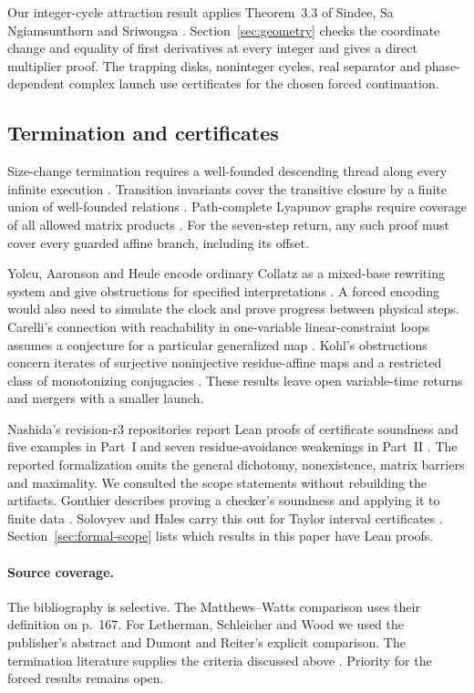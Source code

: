 Our integer-cycle attraction result applies Theorem~3.3 of Sindee, Sa
Ngiamsunthorn and Sriwongsa \cite{sindee-2024}. Section~\ref{sec:geometry}
checks the coordinate change and equality of first derivatives at every
integer and gives a direct multiplier proof. The trapping disks,
noninteger cycles, real separator and phase-dependent complex launch
use certificates for the chosen forced continuation.

\subsection{Termination and certificates}

Size-change termination requires a well-founded descending thread along
every infinite execution \cite{lee-jones-benamram-2001,benamram-2010-monotonicity}.
Transition invariants cover the transitive closure by a finite union of
well-founded relations \cite{podelski-rybalchenko-2004}. Path-complete
Lyapunov graphs require coverage of all allowed matrix products
\cite{ahmadi-et-al-2014}. For the seven-step return, any such proof must
cover every guarded affine branch, including its offset.

Yolcu, Aaronson and Heule encode ordinary Collatz as a mixed-base
rewriting system and give obstructions for specified interpretations
\cite[Section~3.2]{yolcu-aaronson-heule-2023}. A forced encoding would
also need to simulate the clock and prove progress between physical
steps. Carelli's connection with reachability in one-variable
linear-constraint loops assumes a conjecture for a particular
generalized map \cite{carelli-2026}. Kohl's obstructions concern iterates
of surjective noninjective residue-affine maps and a restricted class
of monotonizing conjugacies
\cite{kohl-2007,kohl-2008-conjugates}. These results leave open
variable-time returns and mergers with a smaller launch.

Nashida's revision-r3 repositories report Lean proofs of certificate
soundness and five examples in Part~I and seven residue-avoidance
weakenings in Part~II \cite{nashida-2026,nashida-2026-part-ii}.
The reported formalization omits the general dichotomy, nonexistence,
matrix barriers and maximality. We consulted the scope statements
without rebuilding the artifacts. Gonthier describes proving a checker's
soundness and applying it to finite data \cite{gonthier-2005}. Solovyev
and Hales carry this out for Taylor interval certificates
\cite{solovyev-hales-2013}. Section~\ref{sec:formal-scope} lists which
results in this paper have Lean proofs.

\paragraph{Source coverage.}\label{sec:literature-boundaries}
The bibliography is selective. The Matthews--Watts comparison uses
their definition on p.~167. For Letherman, Schleicher and Wood we used
the publisher's abstract and Dumont and Reiter's explicit comparison.
The termination literature supplies the criteria discussed above
\cite{lee-jones-benamram-2001,podelski-rybalchenko-2004}. Priority for the forced results remains open.
